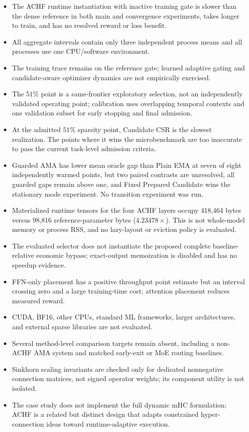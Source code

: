 \documentclass{article}
\newcommand{\achf}{\textsc{ACHF}}
\newcommand{\ama}{\textsc{AMA}}
\begin{document}
\begin{itemize}[leftmargin=*]
\item The ACHF runtime instantiation with inactive training gate is slower than
the dense reference in both main and convergence experiments, takes longer to
train, and has no resolved reward or loss benefit.
\item All aggregate intervals contain only three independent process means and
all processes use one CPU/software environment.
\item The training trace remains on the reference gate; learned adaptive gating
and candidate-aware optimizer dynamics are not empirically exercised.
\item The $51\%$ point is a same-frontier exploratory selection, not an
independently validated operating point; calibration uses overlapping temporal
contexts and one validation subset for early stopping and final admission.
\item At the admitted $51\%$ sparsity point, Candidate CSR is the slowest
realization. The points where it wins the microbenchmark are too inaccurate to
pass the current task-level admission criteria.
\item Guarded \ama{} has lower mean oracle gap than Plain EMA at seven of eight
independently warmed points, but two paired contrasts are unresolved, all
guarded gaps remain above one, and Fixed Prepared Candidate wins the stationary
mode experiment. No transition experiment was run.
\item Materialized runtime tensors for the four ACHF layers occupy 418,464
bytes versus 98,816 reference-parameter bytes ($4.23478\times$). This is not
whole-model memory or process RSS, and no lazy-layout or eviction policy is
evaluated.
\item The evaluated selector does not instantiate the proposed complete
baseline-relative economic bypass; exact-output memoization is disabled and
has no speedup evidence.
\item FFN-only placement has a positive throughput point estimate but an
interval crossing zero and a large training-time cost; attention placement
reduces measured reward.
\item CUDA, BF16, other CPUs, standard ML frameworks, larger architectures, and
external sparse libraries are not evaluated.
\item Several method-level comparison targets remain absent, including a
non-ACHF \ama{} system and matched early-exit or MoE routing baselines.
\item Sinkhorn scaling invariants are checked only for dedicated nonnegative
connection matrices, not signed operator weights; its component utility is not
isolated.
\item The case study does not implement the full dynamic mHC formulation;
\achf{} is a related but distinct design that adapts constrained
hyper-connection ideas toward runtime-adaptive execution.
\end{itemize}
\end{document}
